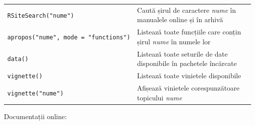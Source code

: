 \documentclass[]{article}
\begin{document}
\begin{longtable}[]{@{}ll@{}}
\begin{minipage}[t]{0.42\columnwidth}\raggedright
\texttt{RSiteSearch("nume")}\strut
\end{minipage} & \begin{minipage}[t]{0.52\columnwidth}\raggedright
Caută șirul de caractere \emph{nume} în manualele online și în
arhivă\strut
\end{minipage}\tabularnewline
\begin{minipage}[t]{0.42\columnwidth}\raggedright
\texttt{apropos("nume",\ mode\ =\ "functions")}\strut
\end{minipage} & \begin{minipage}[t]{0.52\columnwidth}\raggedright
Listează toate funcțiile care conțin șirul \emph{nume} în numele
lor\strut
\end{minipage}\tabularnewline
\begin{minipage}[t]{0.42\columnwidth}\raggedright
\texttt{data()}\strut
\end{minipage} & \begin{minipage}[t]{0.52\columnwidth}\raggedright
Listează toate seturile de date disponibile în pachetele încărcate\strut
\end{minipage}\tabularnewline
\begin{minipage}[t]{0.42\columnwidth}\raggedright
\texttt{vignette()}\strut
\end{minipage} & \begin{minipage}[t]{0.52\columnwidth}\raggedright
Listează toate vinietele disponibile\strut
\end{minipage}\tabularnewline
\begin{minipage}[t]{0.42\columnwidth}\raggedright
\texttt{vignette("nume")}\strut
\end{minipage} & \begin{minipage}[t]{0.52\columnwidth}\raggedright
Afișează vinietele corespunzătoare topicului \emph{nume}\strut
\end{minipage}\tabularnewline
\bottomrule
\end{longtable}

Documentații online:
\end{document}
